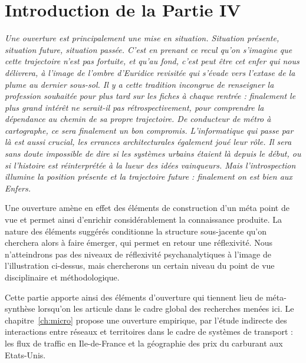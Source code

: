 





\chapter*{Introduction de la Partie IV}







\textit{Une ouverture est principalement une mise en situation. Situation présente, situation future, situation passée. C'est en prenant ce recul qu'on s'imagine que cette trajectoire n'est pas fortuite, et qu'au fond, c'est peut être cet enfer qui nous délivrera, à l'image de l'ombre d'Euridice revisitée qui s'évade vers l'extase de la plume au dernier sous-sol. Il y a cette tradition incongrue de renseigner la profession souhaitée pour plus tard sur les fiches à chaque rentrée : finalement le plus grand intérêt ne serait-il pas rétrospectivement, pour comprendre la dépendance au chemin de sa propre trajectoire. De conducteur de métro à cartographe, ce sera finalement un bon compromis. L'informatique qui passe par là est aussi crucial, les errances architecturales également joué leur rôle. Il sera sans doute impossible de dire si les systèmes urbains étaient là depuis le début, ou si l'histoire est réinterprétée à la lueur des idées vainqueurs. Mais l'introspection illumine la position présente et la trajectoire future : finalement on est bien aux Enfers.}


\bigskip

Une ouverture amène en effet des éléments de construction d'un méta point de vue et permet ainsi d'enrichir considérablement la connaissance produite. La nature des éléments suggérés conditionne la structure sous-jacente qu'on cherchera alors à faire émerger, qui permet en retour une réflexivité. Nous n'atteindrons pas des niveaux de réflexivité psychanalytiques à l'image de l'illustration ci-dessus, mais chercherons un certain niveau du point de vue disciplinaire et méthodologique.

Cette partie apporte ainsi des éléments d'ouverture qui tiennent lieu de méta-synthèse lorsqu'on les articule dans le cadre global des recherches menées ici. Le chapitre~\ref{ch:micro} propose une ouverture empirique, par l'étude indirecte des interactions entre réseaux et territoires dans le cadre de systèmes de transport : les flux de traffic en Ile-de-France et la géographie des prix du carburant aux Etats-Unis.

